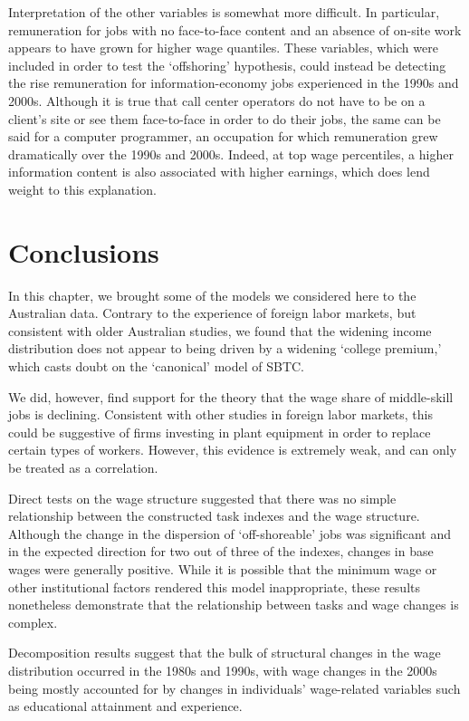 Interpretation of the other variables is somewhat more difficult. In particular, remuneration for jobs with no face-to-face content and an absence of on-site work appears to have grown for higher wage quantiles. These variables, which were included in order to test the `offshoring' hypothesis, could instead be detecting the rise remuneration for information-economy jobs experienced in the 1990s and 2000s. Although it is true that call center operators do not have to be on a client's site or see them face-to-face in order to do their jobs, the same can be said for a computer programmer, an occupation for which remuneration grew dramatically over the 1990s and 2000s. Indeed, at top wage percentiles, a higher information content is also associated with higher earnings, which does lend weight to this explanation.

\section{Conclusions}

In this chapter, we brought some of the models we considered here to the Australian data. Contrary to the experience of foreign labor markets, but consistent with older Australian studies, we found that the widening income distribution does not appear to being driven by a widening `college premium,' which casts doubt on the `canonical' model of SBTC.

We did, however, find support for the theory that the wage share of middle-skill jobs is declining. Consistent with other studies in foreign labor markets, this could be suggestive of firms investing in plant equipment in order to replace certain types of workers. However, this evidence is extremely weak, and can only be treated as a correlation.

Direct tests on the wage structure suggested that there was no simple relationship between the constructed task indexes and the wage structure. Although the change in the dispersion of `off-shoreable' jobs was significant and in the expected direction for two out of three of the indexes, changes in base wages were generally positive. While it is possible that the minimum wage or other institutional factors rendered this model inappropriate, these results nonetheless demonstrate that the relationship between tasks and wage changes is complex.

Decomposition results suggest that the bulk of structural changes in the wage distribution occurred in the 1980s and 1990s, with wage changes in the 2000s being mostly accounted for by changes in individuals' wage-related variables such as educational attainment and experience.

